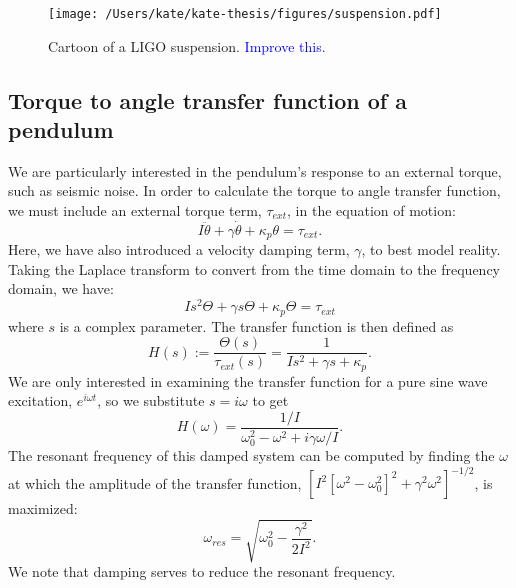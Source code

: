 \begin{figure}
\begin{centering}
\texttt{[image: /Users/kate/kate-thesis/figures/suspension.pdf]}
\caption{Cartoon of a LIGO suspension. \textcolor{blue}{Improve this.}}
\label{fig:suspension}
\end{centering}
\end{figure}




\subsection{Torque to angle transfer function of a pendulum}
\label{sec:t2a}
We are particularly interested in the pendulum's response to an
external torque, such as seismic noise. In order to calculate the
torque to angle transfer function, we must include an external torque
term, $\tau_{ext}$, in the equation of motion:
\begin{equation}
I \ddot{\theta} + \gamma \dot{\theta} + \kappa_p \theta = \tau_{ext}.
\label{eq:eqmotion}
\end{equation}
Here, we have also introduced a velocity damping term, $\gamma$, to
best model reality. Taking the Laplace transform to convert from the
time domain to the frequency domain, we have:
\begin{equation}
I s^2 \Theta + \gamma s \Theta + \kappa_p \Theta = \tau_{ext}
\end{equation}
where $s$ is a complex parameter. The transfer function is then
defined as
\begin{equation}
H(s) := \frac{\Theta(s)}{\tau_{ext}(s)} = \frac{1}{I s^2 + \gamma s + \kappa_p}.
\label{eq:TF}
\end{equation}
We are only interested in examining the transfer function for a pure
sine wave excitation, $e^{i\omega t}$, so we substitute $s=i\omega$ to
get
\begin{equation}
H(\omega) = \frac{1/I}{\omega_0^2  - \omega^2 + i \gamma \omega / I}.
\end{equation}
The resonant frequency of this damped system can be computed by finding the
$\omega$ at which the amplitude of the transfer function, $[I^2
[\omega^2 - \omega_0^2]^2 + \gamma^2 \omega^2]^{-1/2}$, is maximized:
\begin{equation}
\omega_{res} = \sqrt{\omega_0^2 - \frac{\gamma^2}{2I^2}}.
\end{equation}
We note that damping serves to reduce the resonant frequency.

